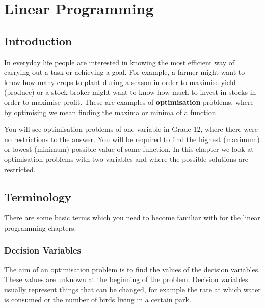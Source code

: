 \chapter{Linear Programming}


\section{Introduction}
In everyday life people are interested in knowing the most efficient way of
carrying out a task or achieving a goal. For example, a farmer might want to
know how many crops to plant during a season in order to maximise yield
(produce) or a stock broker might want to know how much to invest in stocks in order to maximise profit. These are examples of \textbf{optimisation} problems, where by optimising we mean finding the maxima or minima of a function. 

You will see optimisation problems of one variable in Grade 12, %
where there were no restrictions to the answer. You will be required to find the highest (maximum) or lowest (minimum) possible value of some function. In this chapter we look at optimisation problems with two variables and where the possible solutions are restricted. 

\section{Terminology}
There are some basic terms which you need to become familiar with for the linear programming chapters.

\subsection{Decision Variables}
The aim of an optimisation problem is to find the values of the decision variables. These values are unknown at the beginning of the problem. Decision variables usually represent things that can be changed, for example the rate at which water is consumed or the number of birds living in a certain park.

